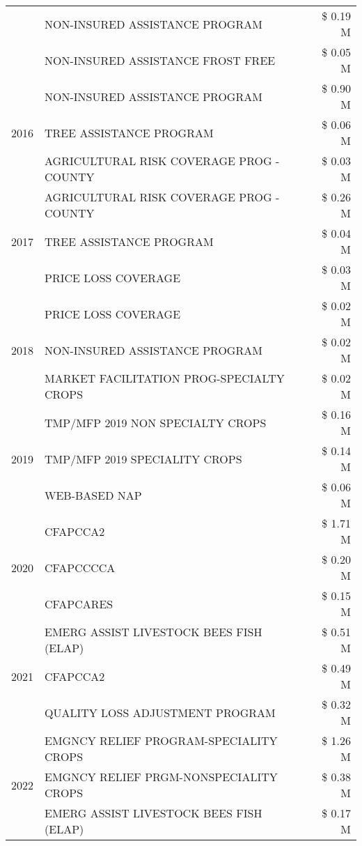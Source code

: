\begin{tabular}{llr}
 & NON-INSURED ASSISTANCE PROGRAM & \$ 0.19 M \\
 & NON-INSURED ASSISTANCE FROST FREE & \$ 0.05 M \\
\cline{1-3}
\multirow[t]{3}{*}{2016} & NON-INSURED ASSISTANCE PROGRAM & \$ 0.90 M \\
 & TREE ASSISTANCE PROGRAM & \$ 0.06 M \\
 & AGRICULTURAL RISK COVERAGE PROG - COUNTY & \$ 0.03 M \\
\cline{1-3}
\multirow[t]{3}{*}{2017} & AGRICULTURAL RISK COVERAGE PROG - COUNTY & \$ 0.26 M \\
 & TREE ASSISTANCE PROGRAM & \$ 0.04 M \\
 & PRICE LOSS COVERAGE & \$ 0.03 M \\
\cline{1-3}
\multirow[t]{3}{*}{2018} & PRICE LOSS COVERAGE & \$ 0.02 M \\
 & NON-INSURED ASSISTANCE PROGRAM & \$ 0.02 M \\
 & MARKET FACILITATION PROG-SPECIALTY CROPS & \$ 0.02 M \\
\cline{1-3}
\multirow[t]{3}{*}{2019} & TMP/MFP 2019 NON SPECIALTY CROPS & \$ 0.16 M \\
 & TMP/MFP 2019 SPECIALITY CROPS & \$ 0.14 M \\
 & WEB-BASED NAP & \$ 0.06 M \\
\cline{1-3}
\multirow[t]{3}{*}{2020} & CFAPCCA2 & \$ 1.71 M \\
 & CFAPCCCCA & \$ 0.20 M \\
 & CFAPCARES & \$ 0.15 M \\
\cline{1-3}
\multirow[t]{3}{*}{2021} & EMERG ASSIST LIVESTOCK BEES FISH (ELAP) & \$ 0.51 M \\
 & CFAPCCA2 & \$ 0.49 M \\
 & QUALITY LOSS ADJUSTMENT PROGRAM & \$ 0.32 M \\
\cline{1-3}
\multirow[t]{3}{*}{2022} & EMGNCY RELIEF PROGRAM-SPECIALITY CROPS & \$ 1.26 M \\
 & EMGNCY RELIEF PRGM-NONSPECIALITY CROPS & \$ 0.38 M \\
 & EMERG ASSIST LIVESTOCK BEES FISH (ELAP) & \$ 0.17 M \\
\cline{1-3}
\bottomrule
\end{tabular}
